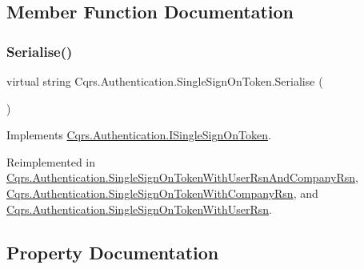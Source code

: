 \subsection{Member Function Documentation}
\mbox{\label{classCqrs_1_1Authentication_1_1SingleSignOnToken_a5e859c6c5db5aaa9ef4e8f2086df4604_a5e859c6c5db5aaa9ef4e8f2086df4604}} 
\subsubsection{\texorpdfstring{Serialise()}{Serialise()}}
{\footnotesize\ttfamily virtual string Cqrs.\+Authentication.\+Single\+Sign\+On\+Token.\+Serialise (\begin{DoxyParamCaption}{ }\end{DoxyParamCaption})\hspace{0.3cm}{\ttfamily [virtual]}}



Implements \hyperlink{interfaceCqrs_1_1Authentication_1_1ISingleSignOnToken_af34e8c0b052865d687064d3381bfbcdb_af34e8c0b052865d687064d3381bfbcdb}{Cqrs.\+Authentication.\+I\+Single\+Sign\+On\+Token}.



Reimplemented in \hyperlink{classCqrs_1_1Authentication_1_1SingleSignOnTokenWithUserRsnAndCompanyRsn_a8d44249c00e5264dc7b37f4868836a80_a8d44249c00e5264dc7b37f4868836a80}{Cqrs.\+Authentication.\+Single\+Sign\+On\+Token\+With\+User\+Rsn\+And\+Company\+Rsn}, \hyperlink{classCqrs_1_1Authentication_1_1SingleSignOnTokenWithCompanyRsn_a0bc9f0fae90121d029fe0730708f4210_a0bc9f0fae90121d029fe0730708f4210}{Cqrs.\+Authentication.\+Single\+Sign\+On\+Token\+With\+Company\+Rsn}, and \hyperlink{classCqrs_1_1Authentication_1_1SingleSignOnTokenWithUserRsn_a8103820e6352c10b3990fb027dd9b5ae_a8103820e6352c10b3990fb027dd9b5ae}{Cqrs.\+Authentication.\+Single\+Sign\+On\+Token\+With\+User\+Rsn}.



\subsection{Property Documentation}
\mbox{\label{classCqrs_1_1Authentication_1_1SingleSignOnToken_aa0ea2d0654dd2aab23af98806663cd7c_aa0ea2d0654dd2aab23af98806663cd7c}} 
